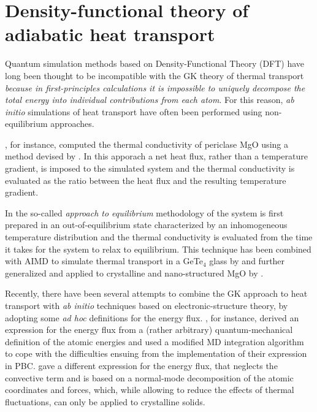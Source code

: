\chapter{Density-functional theory of adiabatic heat transport} \label{ch:dft-heat}

Quantum simulation methods based on Density-Functional Theory (DFT) have long been thought to be incompatible with the GK theory of thermal transport \emph{because in first-principles calculations it is impossible to uniquely decompose the total energy into individual contributions from each atom}. \citep{Stackhouse2010b} For this reason, \emph{ab initio} simulations of heat transport have often been performed using non-equilibrium approaches.

\citet{Stackhouse2010b}, for instance, computed the thermal conductivity of periclase MgO using a method devised by \citet{Müller-Plathe1997}. In this apporach a net heat flux, rather than a temperature gradient, is imposed to the simulated system and the thermal conductivity is evaluated as the ratio between the heat flux and the resulting temperature gradient.

In the so-called \emph{approach to equilibrium} methodology of \citet{Lampin2013} the system is first prepared in an out-of-equilibrium state characterized by an inhomogeneous temperature distribution and the thermal conductivity is evaluated from the time it takes for the system to relax to equilibrium. This technique has been combined with AIMD to simulate thermal transport in a GeTe$_4$ glass by \citet{Bouzid2017} and further generalized and applied to crystalline and nano-structured MgO by \citet{Puligheddu2017}.

Recently, there have been several attempts to combine the GK approach to heat transport with \emph{ab initio} techniques based on electronic-structure theory, by adopting some \emph{ad hoc} definitions for the energy flux. \citet{Kang2017}, for instance, derived an expression for the energy flux from a (rather arbitrary) quantum-mechanical definition of the atomic energies and used a modified MD integration algorithm to cope with the difficulties ensuing from the implementation of their expression in PBC. 
\citet{Carbogno:2017gc} gave a different expression for the energy flux, that neglects the convective term and is based on a normal-mode decomposition of the atomic coordinates and forces, which, while allowing to reduce the effects of thermal fluctuations, can only be applied to crystalline solids.


